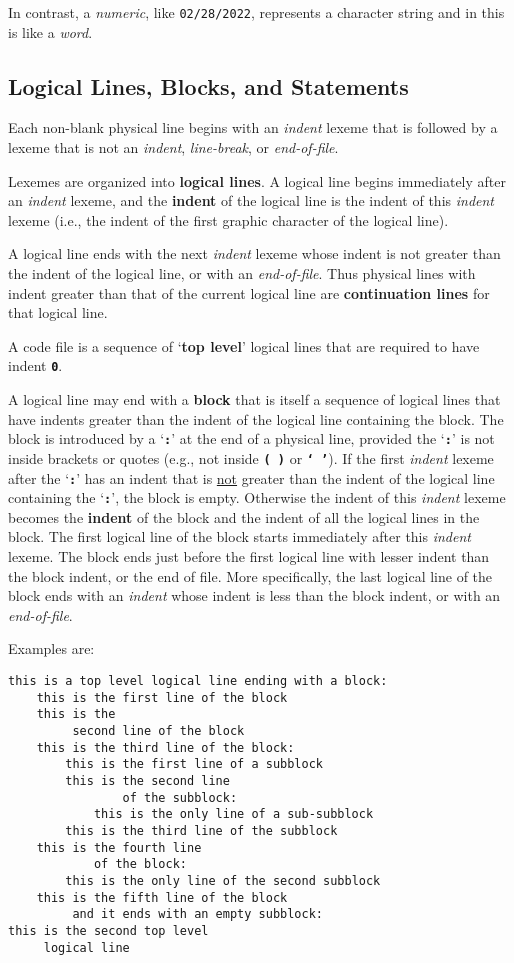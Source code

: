 \documentclass[12pt]{article}
\newcommand{\TT}[1]{{\tt \bfseries #1}}
\newcommand{\key}[1]{{\rm \bfseries #1}}
\newcommand{\skey}[2]{{\rm \bfseries #1#2}}
\newenvironment{indpar}[1][0.3in]%
	{\begin{list}{}%
		     {\setlength{\itemsep}{0in}%
		      \setlength{\topsep}{0in}%
		      \setlength{\parsep}{1ex}%
		      \setlength{\labelwidth}{#1}%
		      \setlength{\leftmargin}{#1}%
		      \addtolength{\leftmargin}{\labelsep}}%
	 \item}%
	{\end{list}}
\begin{document}
In contrast, a {\em numeric}, like {\tt 02/28/2022},
represents a character string and in this
is like a {\em word}.

\subsection{Logical Lines, Blocks, and Statements}
\label{LOGICAL-LINES-BLOCKS-AND-STATEMENTS}

Each non-blank physical line begins with an {\em indent} lexeme
that is followed by a
lexeme that is not an {\em indent}, {\em line-break}, or
{\em end-of-file}.

Lexemes are organized into \skey{logical line}s.  A logical line
begins immediately after an {\em indent} lexeme, and the
\key{indent} of the logical line is the
indent of this {\em indent} lexeme (i.e., the indent of the
first graphic character of the logical line).

A logical line ends with the next {\em indent} lexeme whose indent
is not greater than the indent of the logical line, or with an
{\em end-of-file}.  Thus physical
lines with indent greater than that of the current logical line
are \skey{continuation line}s for that logical line.

A code file is a sequence of `\key{top level}' logical lines that
are required to have indent \TT{0}.

A logical line may end with a \key{block} that is itself a sequence of
logical lines that have indents greater than the indent of the
logical line containing the block.
The block is introduced by a `\TT{:}' at the end
of a physical line, provided the `\TT{:}' is not inside brackets
or quotes
(e.g., not inside \TT{(~)} or \TT{`~'}).
If the first {\em indent} lexeme after the
`\TT{:}' has an indent that is \underline{not} greater than the indent
of the logical line containing the `\TT{:}', the block is empty.
Otherwise the indent of this {\em indent} lexeme becomes the
\key{indent} of the block and the indent of all the
logical lines in the block.  The first logical line of the block
starts immediately after this {\em indent} lexeme.
The block ends just before the first
logical line with lesser indent than the block indent, or the end of file.
More specifically, the last logical line of the block ends with an
{\em indent} whose indent is less than the block indent, or with an
{\em end-of-file}.

Examples are:
\begin{indpar}\begin{verbatim}
this is a top level logical line ending with a block:
    this is the first line of the block
    this is the
         second line of the block
    this is the third line of the block:
        this is the first line of a subblock
        this is the second line
                of the subblock:
            this is the only line of a sub-subblock
        this is the third line of the subblock
    this is the fourth line
            of the block:
        this is the only line of the second subblock
    this is the fifth line of the block
         and it ends with an empty subblock:
this is the second top level
     logical line
\end{verbatim}\end{indpar}
\end{document}
